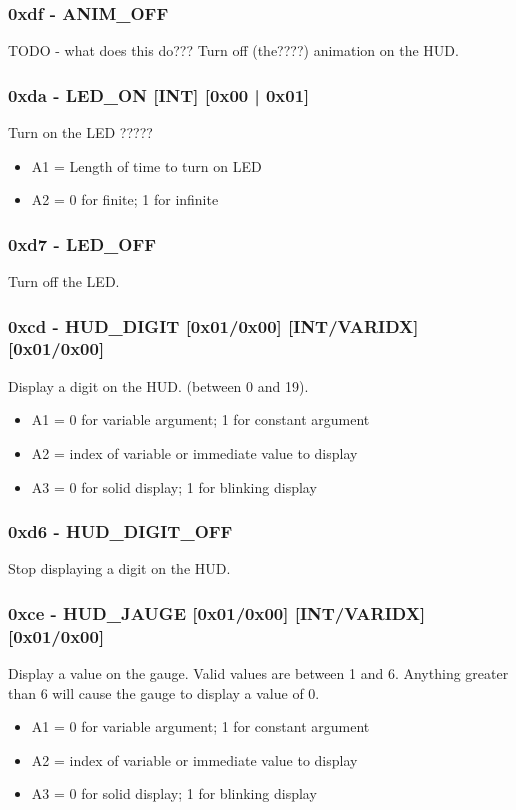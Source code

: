\documentclass[12pt,a4paper]{scrbook}
\begin{document}
\subsubsection{0xdf - ANIM\_OFF}
TODO - what does this do???
Turn off (the????) animation on the HUD.

\subsubsection{0xda - LED\_ON [INT] [0x00 | 0x01]}
Turn on the LED ?????
\begin{itemize}
\item A1 = Length of time to turn on LED
\item A2 = 0 for finite; 1 for infinite
\end{itemize}

\subsubsection{0xd7 - LED\_OFF}
Turn off the LED.



\subsubsection{0xcd - HUD\_DIGIT [0x01/0x00] [INT/VARIDX] [0x01/0x00]}
Display a digit on the HUD. (between 0 and 19).  
\begin{itemize}
\item A1 = 0 for variable argument; 1 for constant argument
\item A2 = index of variable or immediate value to display
\item A3 = 0 for solid display; 1 for blinking display
\end{itemize}

\subsubsection{0xd6 - HUD\_DIGIT\_OFF}
Stop displaying a digit on the HUD.



\subsubsection{0xce - HUD\_JAUGE [0x01/0x00] [INT/VARIDX] [0x01/0x00]}
Display a value on the gauge.  Valid values are between 1 and 6.  Anything greater
than 6 will cause the gauge to display a value of 0.  
\begin{itemize}
\item A1 = 0 for variable argument; 1 for constant argument
\item A2 = index of variable or immediate value to display
\item A3 = 0 for solid display; 1 for blinking display
\end{itemize}
\end{document}
